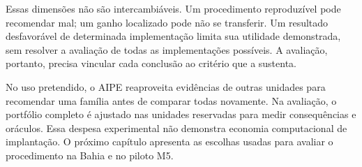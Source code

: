 Essas dimensões não são intercambiáveis. Um procedimento reproduzível pode recomendar mal; um ganho localizado pode não se transferir. Um resultado desfavorável de determinada implementação limita sua utilidade demonstrada, sem resolver a avaliação de todas as implementações possíveis. A avaliação, portanto, precisa vincular cada conclusão ao critério que a sustenta.

No uso pretendido, o AIPE reaproveita evidências de outras unidades para recomendar uma família antes de comparar todas novamente. Na avaliação, o portfólio completo é ajustado nas unidades reservadas para medir consequências e oráculos. Essa despesa experimental não demonstra economia computacional de implantação. O próximo capítulo apresenta as escolhas usadas para avaliar o procedimento na Bahia e no piloto M5.
